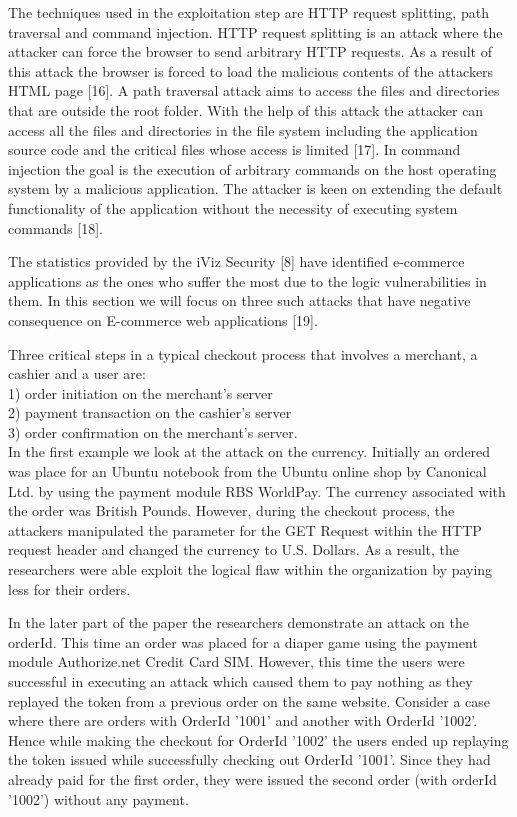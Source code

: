 \documentclass[11pt]{article}
\begin{document}
 The techniques used in the exploitation step are HTTP request splitting, path traversal and command injection. HTTP request splitting is an attack where the attacker can force the browser to send arbitrary HTTP requests. As a result of this attack the browser is forced to load the malicious contents of the attackers HTML page [16]. A path traversal attack aims to access the files and directories that are outside the root folder. With the help of this attack the attacker can access all the files and directories in the file system including the application source code and the critical files whose access is limited [17]. In command injection the goal is the execution of arbitrary commands on the host operating system by a malicious application. The attacker is keen on extending the default functionality of the application without the necessity of executing system commands [18]. 
 
 The statistics provided by the iViz Security [8] have identified e-commerce applications as the ones who suffer the most due to the logic vulnerabilities in them. In this section we will focus on three such attacks that have negative consequence on E-commerce web applications [19].
 
  Three critical steps in a typical checkout process that involves a merchant, a cashier and a user are: \\      1) order initiation on the merchant’s server\\
2) payment transaction on the cashier’s server\\
3) order confirmation on the merchant’s server.\\
 In the first example we look at the attack on the currency. Initially an ordered was place for an Ubuntu notebook from the Ubuntu online shop by Canonical Ltd. by using the payment module RBS WorldPay. The currency associated with the order was British Pounds. However, during the checkout process, the attackers manipulated the parameter for the GET Request within the HTTP request header and changed the currency to U.S. Dollars. As a result, the researchers were able exploit the logical flaw within the organization by paying less for their orders.
 
 In the later part of the paper the researchers demonstrate an attack on the orderId. This time an order was placed for a diaper game using the payment module Authorize.net Credit Card SIM. However, this time the users were successful in executing an attack which caused them to pay nothing as they replayed the token from a previous order on the same website. Consider a case where there are orders with OrderId '1001' and another with OrderId '1002'. Hence while making the checkout for OrderId '1002' the users ended up replaying the token issued while successfully checking out OrderId '1001'. Since they had already paid for the first order, they were issued the second order (with orderId '1002') without any payment.
 
\end{document}
